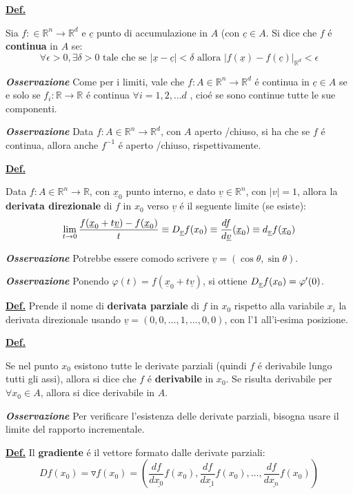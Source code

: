\documentclass[a4paper,10pt]{article} %
\renewcommand{\b}[1]{%
    {\textbf{#1}}}
\renewcommand{\v}[1]{%
    {\underline{#1}}}
\newcommand{\ldef}[1]{%
    {\smallbreak\par\tiny\textbf{\underline{Def.}} {#1} \smallbreak}}
\newcommand{\loss}[1]{%
    {\smallbreak\par\tiny\emph{\textbf{Osservazione}} {#1} \par}}
\begin{document}
\begin{multicols}{6}
\ldef {
    Sia $f:\in \mathbb{R}^n \rightarrow \mathbb{R}^d$ e $\v{c}$ punto di accumulazione in $A$ (con 
    $\v{c} \in A$. Si dice che $f$ é \b{continua} in $A$ se:
    \[
        \forall \epsilon > 0, \exists \delta > 0 \text{ tale che se } | \v{x} - \v{c} | < \delta 
        \text{ allora } |f(\v{x}) - f(\v{c}) |_{\mathbb{R}^d} < \epsilon
    \]
    \loss {
        Come per i limiti, vale che $f : A \in \mathbb{R}^n \rightarrow \mathbb{R}^d$
        é continua in $\v{c} \in A$ se e solo se $f_i : \mathbb{R} \rightarrow \mathbb{R} $ 
        é continua $ \forall i = 1, 2, \dots d$ , cioé se sono continue tutte le sue 
        componenti.
    }
    \loss {
        Data $f : A \in \mathbb{R}^n \rightarrow \mathbb{R}^d$, con $A$ aperto \slash chiuso, 
        si ha che se $f$ é continua, allora anche $f^{-1}$ é aperto \slash chiuso, rispettivamente.
    }
}

\ldef{
    Data $ f :  A \in \mathbb{R}^n \rightarrow \mathbb{R}$, con $ \v{x}_0 $ punto interno, 
    e dato $\v{v} \in \mathbb{R}^n$, con $ |v| = 1$, allora la \b{derivata direzionale} di $f$ in 
    $x_0$ verso $\v{v}$ é il seguente limite (se esiste):
    \[
        \lim_{t \rightarrow 0} \frac{ f(\v{x}_0 + t\v{v}) - f(\v{x}_0)  }{t} \equiv D_\v{v} f(x_0) \equiv 
        \frac{df}{d\v{v}} (\v{x}_0) \equiv d_\v{v} f (\v{x}_0) 
    \]
    \loss{
        Potrebbe essere comodo scrivere $\v{v} = (\cos \theta , \sin\theta )$.
    }
    \loss {
        Ponendo $\varphi(t) = f(\v{x}_0 + t\v{v})$, si ottiene $ D_\v{v} f(x_0) = \varphi'(0)$.
    }
}

\ldef{
    Prende il nome di \b{derivata parziale} di $f$ in $x_0$ rispetto alla variabile $ x_i$ la 
    derivata direzionale usando $ \v{v} = (0, 0, \dots, 1, \dots, 0, 0)$, con l'1 all'i-esima 
    posizione.
}

\ldef{
    Se nel punto $x_0$ esistono tutte le derivate parziali (quindi $f$ é derivabile lungo tutti 
    gli assi), allora si dice che $f$ é \b{derivabile} in $x_0$.
    Se risulta derivabile per $\forall x_0 \in A$, allora si dice derivabile in $A$.
    \loss{
        Per verificare l'esistenza delle derivate parziali, bisogna usare
        il limite del rapporto incrementale.
    }
}

\ldef{
    Il \b{gradiente} é il vettore formato dalle derivate parziali:
    \[
        D f(x_0) = \triangledown f(x_0) = (
            \frac{df}{d\v{x_0}} f(x_0),
            \frac{df}{d\v{x_1}} f(x_0),
            \dots,
            \frac{df}{d\v{x_n}} f(x_0))
    \]
}


\end{multicols}
\end{document}
